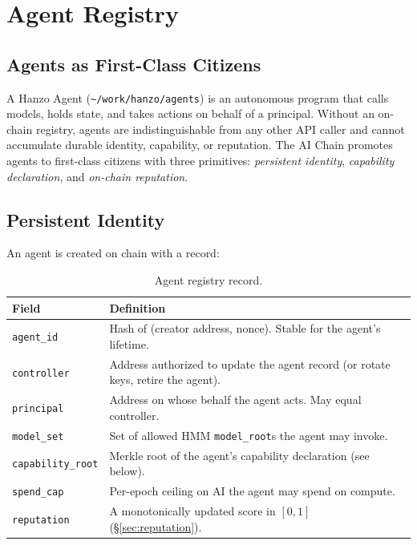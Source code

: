 \section{Agent Registry}
\label{sec:agents}

\subsection{Agents as First-Class Citizens}

A Hanzo Agent (\texttt{\textasciitilde/work/hanzo/agents}) is an
autonomous program that calls models, holds state, and takes actions on
behalf of a principal. Without an on-chain registry, agents are
indistinguishable from any other API caller and cannot accumulate
durable identity, capability, or reputation. The AI Chain promotes
agents to first-class citizens with three primitives: \emph{persistent
identity}, \emph{capability declaration}, and \emph{on-chain reputation}.

\subsection{Persistent Identity}

An agent is created on chain with a record:

\begin{table}[h]
\centering
\small
\begin{tabular}{lp{6.0cm}}
\toprule
\textbf{Field} & \textbf{Definition} \\
\midrule
\texttt{agent\_id}      & Hash of (creator address, nonce). Stable for
                          the agent's lifetime. \\
\texttt{controller}     & Address authorized to update the agent
                          record (or rotate keys, retire the agent). \\
\texttt{principal}      & Address on whose behalf the agent acts.
                          May equal controller. \\
\texttt{model\_set}     & Set of allowed HMM \texttt{model\_root}s the
                          agent may invoke. \\
\texttt{capability\_root}& Merkle root of the agent's capability
                           declaration (see below). \\
\texttt{spend\_cap}     & Per-epoch ceiling on AI the agent may spend
                          on compute. \\
\texttt{reputation}     & A monotonically updated score in $[0,1]$
                          (\S\ref{sec:reputation}). \\
\bottomrule
\end{tabular}
\caption{Agent registry record.}
\end{table}

